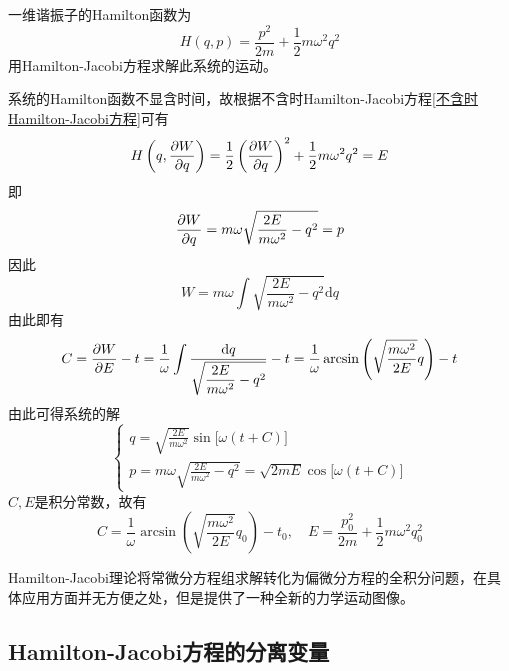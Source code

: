 \begin{example}
一维谐振子的Hamilton函数为
\begin{equation*}
	H(q,p) = \frac{p^2}{2m} + \frac12 m\omega^2 q^2
\end{equation*}
用Hamilton-Jacobi方程求解此系统的运动。
\end{example}
\begin{solution}
系统的Hamilton函数不显含时间，故根据不含时Hamilton-Jacobi方程\eqref{不含时Hamilton-Jacobi方程}可有
\begin{equation*}
	H\left(q,\frac{\partial W}{\partial q}\right) = \frac12 \left(\frac{\partial W}{\partial q}\right)^2 + \frac12 m\omega^2 q^2 = E
\end{equation*}
即
\begin{equation*}
	\frac{\partial W}{\partial q} = m\omega \sqrt{\frac{2E}{m\omega^2} - q^2} = p
\end{equation*}
因此
\begin{equation*}
	W = m\omega \int \sqrt{\frac{2E}{m\omega^2} - q^2} \mathrm{d} q
\end{equation*}
由此即有
\begin{equation*}
	C = \frac{\partial W}{\partial E} - t = \frac{1}{\omega} \int \frac{\mathrm{d} q}{\sqrt{\dfrac{2E}{m\omega^2}-q^2}} - t = \frac{1}{\omega} \arcsin\left(\sqrt{\frac{m\omega^2}{2E}}q\right) - t
\end{equation*}
由此可得系统的解
\begin{equation*}
\begin{cases}
	\displaystyle q = \sqrt{\frac{2E}{m\omega^2}} \sin \big[\omega(t+C)\big] \\[1.5ex]
	\displaystyle p = m\omega \sqrt{\frac{2E}{m\omega^2} - q^2} = \sqrt{2mE} \cos \big[\omega(t+C)\big]
\end{cases}
\end{equation*}
$C,E$是积分常数，故有
\begin{equation*}
	C = \frac{1}{\omega} \arcsin\left(\sqrt{\frac{m\omega^2}{2E}}q_0\right) - t_0,\quad E = \frac{p_0^2}{2m} + \frac12 m\omega^2 q_0^2
\end{equation*}
\end{solution}

Hamilton-Jacobi理论将常微分方程组求解转化为偏微分方程的全积分问题，在具体应用方面并无方便之处，但是提供了一种全新的力学运动图像。

\subsection{Hamilton-Jacobi方程的分离变量}

